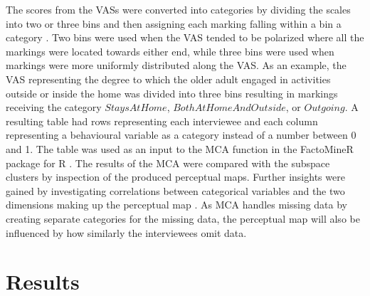 The scores from the VASs were converted into categories by dividing the scales into two or three bins and then assigning each marking falling within a bin a category \citep{Abdi2007}. Two bins were used when the VAS tended to be polarized where all the markings were located towards either end, while three bins were used when markings were more uniformly distributed along the VAS. As an example, the VAS representing the degree to which the older adult engaged in activities outside or inside the home was divided into three bins resulting in markings receiving the category $StaysAtHome$, $BothAtHomeAndOutside$, or $Outgoing$. A resulting table had rows representing each interviewee and each column representing a behavioural variable as a category instead of a number between 0 and 1. The table was used as an input to the MCA function in the FactoMineR package for R \citep{Husson}. The results of the MCA were compared with the subspace clusters by inspection of the produced perceptual maps. Further insights were gained by investigating correlations between categorical variables and the two dimensions making up the perceptual map \citep{Laporte2012}. As MCA handles missing data by creating separate categories for the missing data, the perceptual map will also be influenced by how similarly the interviewees omit data. %

\section{Results}

